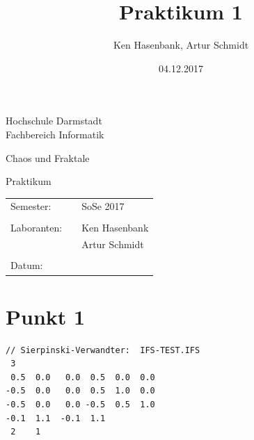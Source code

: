 \documentclass[10pt,a4paper]{article}
\author{Ken Hasenbank, Artur Schmidt}
\title{Praktikum 1}
\date{04.12.2017}
\begin{document}

\begin{titlepage}
\begin{center}
	\Large{Hochschule Darmstadt}\\
	\large{Fachbereich Informatik}
\end{center}

\vspace{1cm}
\begin{center}
	\large{Chaos und Fraktale}
\end{center}

\vspace{2,5cm}
\begin{center}
	\huge{Praktikum}\\
\end{center}



\vspace{6cm}
\begin{center}
{\large 
\begin{tabular}{lll}
	Semester: && SoSe 2017\\
	\vspace{1mm}\\
	Laboranten: && Ken Hasenbank\\
	&& Artur Schmidt\\
	\vspace{1 mm}\\
	Datum:	&& \@date\\
	\end{tabular} 
	}%
\end{center}

\end{titlepage}

\section{Punkt 1}
\begin{lstlisting}
// Sierpinski-Verwandter:  IFS-TEST.IFS
 3
 0.5  0.0   0.0  0.5  0.0  0.0
-0.5  0.0   0.0  0.5  1.0  0.0
-0.5  0.0   0.0 -0.5  0.5  1.0
-0.1  1.1  -0.1  1.1
 2    1
\end{lstlisting}
\end{document}
